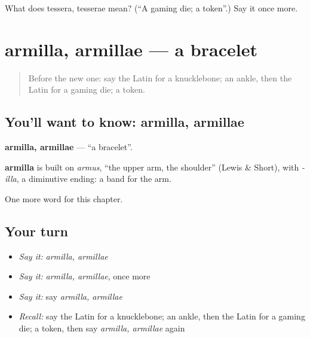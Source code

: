 \begin{tcolorbox}[breakable,colback=teal!4,colframe=teal!35!black,title={Before you move on}]
What does tessera, tesserae mean? (\textquotedblleft{}A gaming die; a token\textquotedblright{}.) Say it once more.
\end{tcolorbox}
\section[armilla, armillae]{armilla, armillae — a bracelet}

\label{lesson:LA-C193-armilla}



\begin{quote}
Before the new one: say the Latin for a knucklebone; an ankle, then the Latin for a gaming die; a token.
\end{quote}

\subsection*{You'll want to know: armilla, armillae}
\textbf{armilla, armillae} — \textquotedblleft{}a bracelet\textquotedblright{}.

\begin{cousinweb}
\textbf{armilla} is built on \emph{armus}, \textquotedblleft{}the upper arm, the shoulder\textquotedblright{} (Lewis \& Short), with \emph{-illa}, a diminutive ending: a band for the arm.
\end{cousinweb}

\begin{grammarlens}[title={What you've built}]
One more word for this chapter.
\end{grammarlens}

\subsection*{Your turn}
\begin{itemize}
\raggedright
  \item \emph{Say it:} \emph{armilla, armillae}
  \item \emph{Say it:} \emph{armilla, armillae}, once more
  \item \emph{Say it:} say \emph{armilla, armillae}
  \item \emph{Recall:} say the Latin for a knucklebone; an ankle, then the Latin for a gaming die; a token, then say \emph{armilla, armillae} again
\end{itemize}

